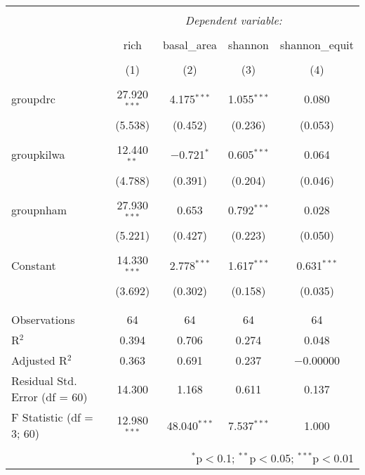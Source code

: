 
\begin{table}[!htbp] \centering 
  \caption{} 
  \label{} 
\begin{tabular}{@{\extracolsep{5pt}}lcccc} 
\\[-1.8ex]\hline 
\hline \\[-1.8ex] 
 & \multicolumn{4}{c}{\textit{Dependent variable:}} \\ 
\cline{2-5} 
\\[-1.8ex] & rich & basal\_area & shannon & shannon\_equit \\ 
\\[-1.8ex] & (1) & (2) & (3) & (4)\\ 
\hline \\[-1.8ex] 
 groupdrc & 27.920$^{***}$ & 4.175$^{***}$ & 1.055$^{***}$ & 0.080 \\ 
  & (5.538) & (0.452) & (0.236) & (0.053) \\ 
  & & & & \\ 
 groupkilwa & 12.440$^{**}$ & $-$0.721$^{*}$ & 0.605$^{***}$ & 0.064 \\ 
  & (4.788) & (0.391) & (0.204) & (0.046) \\ 
  & & & & \\ 
 groupnham & 27.930$^{***}$ & 0.653 & 0.792$^{***}$ & 0.028 \\ 
  & (5.221) & (0.427) & (0.223) & (0.050) \\ 
  & & & & \\ 
 Constant & 14.330$^{***}$ & 2.778$^{***}$ & 1.617$^{***}$ & 0.631$^{***}$ \\ 
  & (3.692) & (0.302) & (0.158) & (0.035) \\ 
  & & & & \\ 
\hline \\[-1.8ex] 
Observations & 64 & 64 & 64 & 64 \\ 
R$^{2}$ & 0.394 & 0.706 & 0.274 & 0.048 \\ 
Adjusted R$^{2}$ & 0.363 & 0.691 & 0.237 & $-$0.00000 \\ 
Residual Std. Error (df = 60) & 14.300 & 1.168 & 0.611 & 0.137 \\ 
F Statistic (df = 3; 60) & 12.980$^{***}$ & 48.040$^{***}$ & 7.537$^{***}$ & 1.000 \\ 
\hline 
\hline \\[-1.8ex] 
\multicolumn{5}{r}{$^{*}$p$<$0.1; $^{**}$p$<$0.05; $^{***}$p$<$0.01} \\ 
\end{tabular} 
\end{table} 
